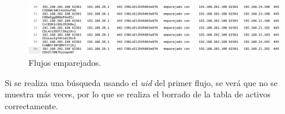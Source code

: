 \begin{figure}[H]
  \includegraphics[width=1\textwidth]{imagenes/flujosemparejados.png}
  \centering
  \caption{Flujos emparejados.}\label{fig.flujosemparejados}
\end{figure}

\intro Si se realiza una búsqueda usando el \textit{uid} del primer flujo, se verá que no se muestra más veces, por lo que se realiza 
el borrado de la tabla de activos correctamente.

